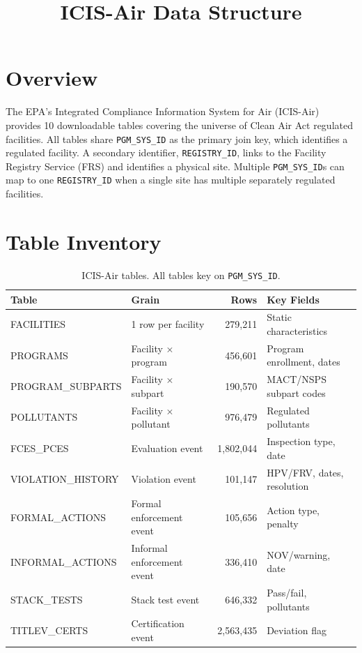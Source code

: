 \documentclass[11pt]{article}
\title{ICIS-Air Data Structure}
\author{}
\date{}
\begin{document}
\maketitle

\section{Overview}

The EPA's Integrated Compliance Information System for Air (ICIS-Air) provides 10 downloadable tables covering the universe of Clean Air Act regulated facilities. All tables share \texttt{PGM\_SYS\_ID} as the primary join key, which identifies a regulated facility. A secondary identifier, \texttt{REGISTRY\_ID}, links to the Facility Registry Service (FRS) and identifies a physical site. Multiple \texttt{PGM\_SYS\_ID}s can map to one \texttt{REGISTRY\_ID} when a single site has multiple separately regulated facilities.

\section{Table Inventory}

\begin{table}[H]
\centering
\begin{tabular}{llrl}
\toprule
Table & Grain & Rows & Key Fields \\
\midrule
FACILITIES & 1 row per facility & 279,211 & Static characteristics \\
PROGRAMS & Facility $\times$ program & 456,601 & Program enrollment, dates \\
PROGRAM\_SUBPARTS & Facility $\times$ subpart & 190,570 & MACT/NSPS subpart codes \\
POLLUTANTS & Facility $\times$ pollutant & 976,479 & Regulated pollutants \\
FCES\_PCES & Evaluation event & 1,802,044 & Inspection type, date \\
VIOLATION\_HISTORY & Violation event & 101,147 & HPV/FRV, dates, resolution \\
FORMAL\_ACTIONS & Formal enforcement event & 105,656 & Action type, penalty \\
INFORMAL\_ACTIONS & Informal enforcement event & 336,410 & NOV/warning, date \\
STACK\_TESTS & Stack test event & 646,332 & Pass/fail, pollutants \\
TITLEV\_CERTS & Certification event & 2,563,435 & Deviation flag \\
\bottomrule
\end{tabular}
\caption{ICIS-Air tables. All tables key on \texttt{PGM\_SYS\_ID}.}
\end{table}
\end{document}
